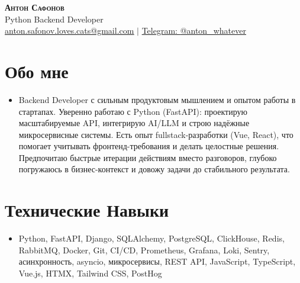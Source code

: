 \documentclass[letterpaper,11pt]{article}
\begin{document}
\vspace*{-50pt}

\begin{center}
    \textbf{\huge \scshape Антон Сафонов} \\ \vspace{-1pt}
    \large Python Backend Developer \\ \vspace{-1pt}
    \small \href{mailto:anton.safonov.loves.cats@gmail.com}{\underline{anton.safonov.loves.cats@gmail.com}} $|$ 
    \href{https://t.me/anton_whatever}{Telegram: \underline{@anton\_whatever}} 
\end{center}

\section{Обо мне}
\small\begin{itemize}[leftmargin=0.15in, label={}]
\item{Backend Developer с сильным продуктовым мышлением и опытом работы в стартапах. Уверенно работаю с Python (FastAPI): проектирую масштабируемые API, интегрирую AI/LLM и строю надёжные микросервисные системы. Есть опыт fullstack-разработки (Vue, React), что помогает учитывать фронтенд-требования и делать целостные решения. Предпочитаю быстрые итерации действиям вместо разговоров, глубоко погружаюсь в бизнес-контекст и довожу задачи до стабильного результата.}
\end{itemize}
\section{Технические Навыки}
 \begin{itemize}[leftmargin=0.15in, label={}]
    \item Python, FastAPI, Django, SQLAlchemy, PostgreSQL, ClickHouse, Redis, RabbitMQ, Docker, Git, CI/CD, Prometheus, Grafana, Loki, Sentry, асинхронность, asyncio, микросервисы, REST API, JavaScript, TypeScript, Vue.js, HTMX, Tailwind CSS, PostHog
 \end{itemize}
\end{document}
